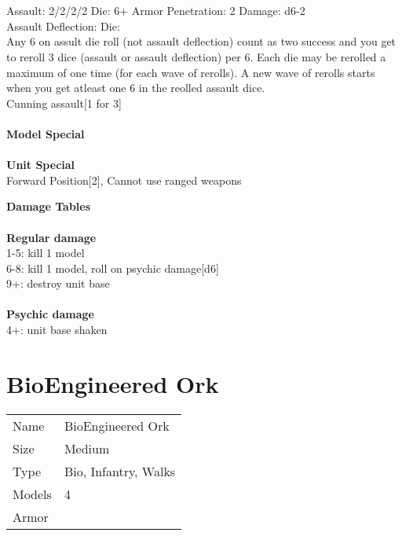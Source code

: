 \ \\

\ \\
Assault: 2/2/2/2 Die: 6+ Armor Penetration: 2 Damage: d6-2 \\
Assault Deflection:  Die: \\
\indent Any 6 on assult die roll (not assault deflection) count as two success and you get to reroll 3 dice (assault or assault deflection) per 6. Each die may be rerolled a maximum of one time (for each wave of rerolls). A new wave of rerolls starts when you get atleast one 6 in the reolled assault dice.\\ Cunning assault[1 for 3] \\
\ \\
{\bf Model Special} \\

\ \\



{\bf Unit Special} \\
Forward Position[2], Cannot use ranged weapons

{\bf Damage Tables} \\
\ \\ {\bf Regular damage } \\
1-5: kill 1 model \\
6-8: kill 1 model, roll on psychic damage[d6] \\
9+: destroy unit base \\
\ \\ {\bf Psychic damage } \\
4+: unit base shaken \\










\pagebreak

\section{ BioEngineered Ork }

\begin{tabular}{ll}
  Name & BioEngineered Ork \\
  Size & Medium\\
  Type & Bio, Infantry, Walks\\
  Models & 4\\
  Armor & \\
\end{tabular}



